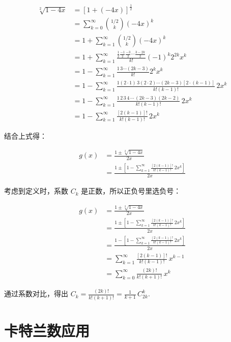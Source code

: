 \begin{align*}
  \sqrt[2]{1-4x} &= [1 + (-4x)]^{\frac{1}{2}} \\
                 &= \sum_{k=0}^\infty \binom{1/2}{k} (-4x)^k \\
                 &= 1 + \sum_{k=1}^\infty \binom{1/2}{k} (-4x)^k \\
                 &= 1 + \sum_{k=1}^\infty \frac{\frac{1}{2}\frac{-1}{2}\frac{-3}{2}\cdots\frac{3-2k}{2}}{k!} (-1)^k 2^{2k} x^k \\
                 &= 1 - \sum_{k=1}^\infty \frac{1 \,3 \cdots (2k - 3)}{k!} 2^k x^k \\
                 &= 1 - \sum_{k=1}^\infty \frac{1 (2 \cdot 1) \, 3 (2 \cdot 2) \cdots (2k - 3)[2 \cdot (k-1)]}{k!(k-1)!} \, 2x^k \\
                 &= 1 - \sum_{k=1}^\infty \frac{1 \, 2 \, 3 \, 4 \, \cdots \, (2k - 3)(2k - 2)}{k!(k-1)!} \, 2x^k \\
                 &= 1 - \sum_{k=1}^\infty \frac{[2(k - 1)]!}{k!(k-1)!} \, 2x^k
\end{align*}

结合上式得：

\begin{align*}
  g(x) &= \frac{1 \pm \sqrt[2]{1-4x}}{2x} \\
  &= \frac{1 \pm [1 - \sum_{k=1}^\infty \frac{[2(k - 1)]!}{k!(k-1)!} \, 2x^k]}{2x}
\end{align*}

考虑到定义时，系数 $C_k$ 是正数，所以正负号里选负号：

\begin{align*}
  g(x) &= \frac{1 \pm \sqrt[2]{1-4x}}{2x} \\
       &= \frac{1 \pm [1 - \sum_{k=1}^\infty \frac{[2(k -
         1)]!}{k!(k-1)!} \, 2x^k]}{2x} \\
       &= \frac{1 - [1 - \sum_{k=1}^\infty \frac{[2(k - 1)]!}{k!(k-1)!}
         \, 2x^k]}{2x} \\
       &= \sum_{k=1}^\infty \frac{[2(k - 1)]!}{k!(k-1)!} \, x^{k-1} \\
       &= \sum_{k=0}^\infty \frac{(2k)!}{k!(k+1)!} \, x^k
\end{align*}

通过系数对比，得出 $C_k = \frac{(2k)!}{k!(k+1)!} = \frac{1}{k+1}\,C_{2k}^k$.

\section{卡特兰数应用}

